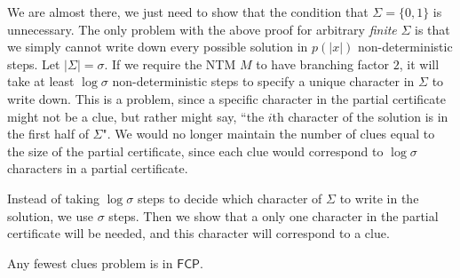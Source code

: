 \documentclass[runningheads,a4paper]{llncs}
\begin{document}
We are almost there, we just need to show that the condition that $\Sigma = \{ 0, 1\}$ is unnecessary. The only problem with the above proof for arbitrary \emph{finite} $\Sigma$ is that we simply cannot write down every possible solution in $p(|x|)$ non-deterministic steps. Let $|\Sigma| = \sigma$. If we require the NTM $M$ to have branching factor $2$, it will take at least $\log \sigma$ non-deterministic steps to specify a unique character in $\Sigma$ to write down. This is a problem, since a specific character in the partial certificate might not be a clue, but rather might say, ``the $i$th character of the solution is in the first half of $\Sigma$". We would no longer maintain the number of clues equal to the size of the partial certificate, since each clue would correspond to $\log \sigma$ characters in a partial certificate. 

Instead of taking $\log \sigma$ steps to decide which character of $\Sigma$ to write in the solution, we use $\sigma$ steps. Then we show that a only one character in the partial certificate will be needed, and this character will correspond to a clue.

\begin{proposition}
Any fewest clues problem is in $\mathsf{FCP}$.
\end{proposition}
\end{document}
